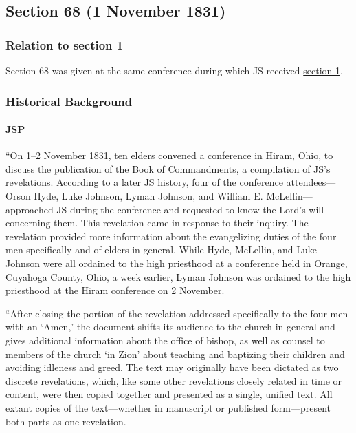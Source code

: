 \subsection{Section 68 (1 November 1831)}
	\label{DC68}
	
	\subsubsection{Relation to section 1}
	
		Section 68 was given at the same conference during which JS received \hyperref[DC1]{section 1}.
	
	\subsubsection{Historical Background}
		\label{DC68-HB}
		
		\paragraph{JSP}
		
			``On 1--2 November 1831, ten elders convened a conference in Hiram, Ohio, to discuss the publication of the Book of Commandments, a compilation of JS's revelations. According to a later JS history, four of the conference attendees---Orson Hyde, Luke Johnson, Lyman Johnson, and William E. McLellin---approached JS during the conference and requested to know the Lord's will concerning them. This revelation came in response to their inquiry. The revelation provided more information about the evangelizing duties of the four men specifically and of elders in general. While Hyde, McLellin, and Luke Johnson were all ordained to the high priesthood at a conference held in Orange, Cuyahoga County, Ohio, a week earlier, Lyman Johnson was ordained to the high priesthood at the Hiram conference on 2 November.
			
			``After closing the portion of the revelation addressed specifically to the four men with an `Amen,' the document shifts its audience to the church in general and gives additional information about the office of bishop, as well as counsel to members of the church `in Zion' about teaching and baptizing their children and avoiding idleness and greed. The text may originally have been dictated as two discrete revelations, which, like some other revelations closely related in time or content, were then copied together and presented as a single, unified text. All extant copies of the text---whether in manuscript or published form---present both parts as one revelation.
			
